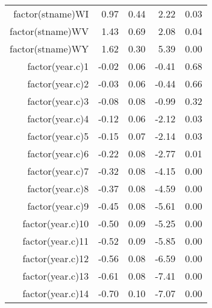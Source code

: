 \begin{table}[ht]
\begin{tabular}{rrrrr}
  factor(stname)WI & 0.97 & 0.44 & 2.22 & 0.03 \\ 
  factor(stname)WV & 1.43 & 0.69 & 2.08 & 0.04 \\ 
  factor(stname)WY & 1.62 & 0.30 & 5.39 & 0.00 \\ 
  factor(year.c)1 & -0.02 & 0.06 & -0.41 & 0.68 \\ 
  factor(year.c)2 & -0.03 & 0.06 & -0.44 & 0.66 \\ 
  factor(year.c)3 & -0.08 & 0.08 & -0.99 & 0.32 \\ 
  factor(year.c)4 & -0.12 & 0.06 & -2.12 & 0.03 \\ 
  factor(year.c)5 & -0.15 & 0.07 & -2.14 & 0.03 \\ 
  factor(year.c)6 & -0.22 & 0.08 & -2.77 & 0.01 \\ 
  factor(year.c)7 & -0.32 & 0.08 & -4.15 & 0.00 \\ 
  factor(year.c)8 & -0.37 & 0.08 & -4.59 & 0.00 \\ 
  factor(year.c)9 & -0.45 & 0.08 & -5.61 & 0.00 \\ 
  factor(year.c)10 & -0.50 & 0.09 & -5.25 & 0.00 \\ 
  factor(year.c)11 & -0.52 & 0.09 & -5.85 & 0.00 \\ 
  factor(year.c)12 & -0.56 & 0.08 & -6.59 & 0.00 \\ 
  factor(year.c)13 & -0.61 & 0.08 & -7.41 & 0.00 \\ 
  factor(year.c)14 & -0.70 & 0.10 & -7.07 & 0.00 \\ 
   \hline
\end{tabular}
\end{table}
